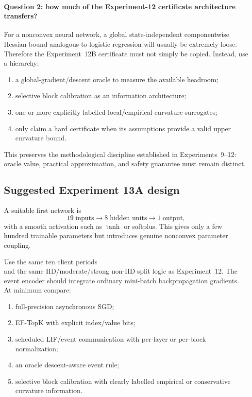 \paragraph{Question 2: how much of the Experiment-12 certificate architecture transfers?}
For a nonconvex neural network, a global state-independent componentwise Hessian bound analogous to logistic regression will usually be extremely loose. Therefore the Experiment~12B certificate must not simply be copied. Instead, use a hierarchy:
\begin{enumerate}
 \item a global-gradient/descent oracle to measure the available headroom;
 \item selective block calibration as an information architecture;
 \item one or more explicitly labelled local/empirical curvature surrogates;
 \item only claim a hard certificate when its assumptions provide a valid upper curvature bound.
\end{enumerate}
This preserves the methodological discipline established in Experiments~9--12: oracle value, practical approximation, and safety guarantee must remain distinct.

\subsection{Suggested Experiment 13A design}

A suitable first network is
\begin{equation}
  19\;\text{inputs}\rightarrow 8\;\text{hidden units}\rightarrow1\;\text{output},
\end{equation}
with a smooth activation such as $\tanh$ or softplus. This gives only a few hundred trainable parameters but introduces genuine nonconvex parameter coupling.

Use the same ten client periods
\begin{equation}
  [1,1,2,2,5,5,10,10,20,20]
\end{equation}
and the same IID/moderate/strong non-IID split logic as Experiment~12. The event encoder should integrate ordinary mini-batch backpropagation gradients. At minimum compare:
\begin{enumerate}
 \item full-precision asynchronous SGD;
 \item EF-TopK with explicit index/value bits;
 \item scheduled LIF/event communication with per-layer or per-block normalization;
 \item an oracle descent-aware event rule;
 \item selective block calibration with clearly labelled empirical or conservative curvature information.
\end{enumerate}

